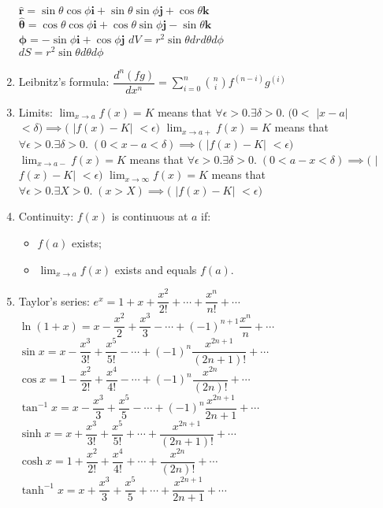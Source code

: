 \documentclass[fleqn]{article}
\begin{document}
\begin{enumerate}
        $\mathbf{\hat{r}}=\sin\theta\cos\phi\mathbf{i}+\sin\theta\sin\phi\mathbf{j}+\cos\theta\mathbf{k}$\\
        $\mathbf{\hat{\theta}}=\cos\theta\cos\phi\mathbf{i}+\cos\theta\sin\phi\mathbf{j}-\sin\theta\mathbf{k}$\\
        $\mathbf{\hat{\phi}}=-\sin\phi\mathbf{i}+\cos\phi\mathbf{j}$\smallbreak
        $dV=r^2\sin\theta dr d\theta d\phi$\\
        $dS=r^2\sin\theta d\theta d\phi$
    \item Leibnitz's formula:\smallbreak
        $\dfrac{d^n(fg)}{dx^n}=\displaystyle\sum_{i=0}^{n}\binom{n}{i}f^{(n-i)}g^{(i)}$
    \item Limits: \smallbreak
        $\displaystyle\lim_{x\to a}f(x)=K$ means that
        $\forall\epsilon>0.\exists\delta>0.\;(0<$ $|$$x-a$$|$ $<\delta)\implies($ $|$$f(x)-K$$|$ $<\epsilon)$\smallbreak
        $\displaystyle\lim_{x\to a+}f(x)=K$ means that
        $\forall\epsilon>0.\exists\delta>0.\;(0<x-a<\delta)\implies($ $|$$f(x)-K$$|$ $<\epsilon)$\smallbreak
        $\displaystyle\lim_{x\to a-}f(x)=K$ means that
        $\forall\epsilon>0.\exists\delta>0.\;(0<a-x<\delta)\implies($ $|$$f(x)-K$$|$ $<\epsilon)$\smallbreak
        $\displaystyle\lim_{x\to\infty}f(x)=K$ means that
        $\forall\epsilon>0.\exists X>0.\;(x>X)\implies($ $|$$f(x)-K$$|$ $<\epsilon)$
    \item Continuity: $f(x)$ is continuous at $a$ if:
        \begin{itemize}
            \item $f(a)$ exists;
            \item $\displaystyle\lim_{x\to a}f(x)$ exists and equals $f(a)$.
        \end{itemize}
    \newpage
    \item Taylor's series:\smallbreak
        $e^x=1+x+\dfrac{x^2}{2!}+\cdots+\dfrac{x^n}{n!}+\cdots$\smallbreak
        $\ln(1+x)=x-\dfrac{x^2}{2}+\dfrac{x^3}{3}-\cdots+(-1)^{n+1}\dfrac{x^n}{n}+\cdots$\smallbreak
        $\sin x=x-\dfrac{x^3}{3!}+\dfrac{x^5}{5!}-\cdots+(-1)^n\dfrac{x^{2n+1}}{(2n+1)!}+\cdots$\smallbreak
        $\cos x=1-\dfrac{x^2}{2!}+\dfrac{x^4}{4!}-\cdots+(-1)^n\dfrac{x^{2n}}{(2n)!}+\cdots$\smallbreak
        $\tan^{-1}x=x-\dfrac{x^3}{3}+\dfrac{x^5}{5}-\cdots+(-1)^n\dfrac{x^{2n+1}}{2n+1}+\cdots$\smallbreak
        $\sinh x=x+\dfrac{x^3}{3!}+\dfrac{x^5}{5!}+\cdots+\dfrac{x^{2n+1}}{(2n+1)!}+\cdots$\smallbreak
        $\cosh x=1+\dfrac{x^2}{2!}+\dfrac{x^4}{4!}+\cdots+\dfrac{x^{2n}}{(2n)!}+\cdots$\smallbreak
        $\tanh^{-1}x=x+\dfrac{x^3}{3}+\dfrac{x^5}{5}+\cdots+\dfrac{x^{2n+1}}{2n+1}+\cdots$

\end{enumerate}
\end{document}
